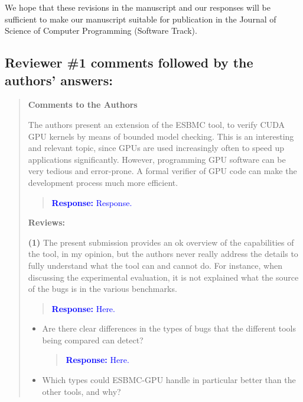 \documentclass[11pt]{article}
\newcommand\vi{\vspace{\baselineskip}}
\begin{document}
\vi

We hope that these revisions in the manuscript and our responses will be sufficient to make our manuscript suitable for publication in the Journal of Science of Computer Programming (Software Track).

\newpage

\vi
\subsection*{Reviewer \#1 comments followed by the authors' answers:}

\begin{quote}

{\bf Comments to the Authors}

The authors present an extension of the ESBMC tool, to verify CUDA GPU kernels by means of bounded model checking. This is an interesting and relevant topic, since GPUs are used increasingly often to speed up applications significantly. However, programming GPU software can be very tedious and error-prone. A formal verifier of GPU code can make the development process much more efficient.

\begin{quote}
\textcolor{blue}{\textbf{Response:} Response.}
\end{quote}

{\bf Reviews:}

{\bf (1)} The present submission provides an ok overview of the capabilities of the tool, in my opinion, but the authors never really address the details to fully understand what the tool can and cannot do. For instance, when discussing the experimental evaluation, it is not explained what the source of the bugs is in the various benchmarks.

\begin{quote}
\textcolor{blue}{\textbf{Response:} Here.}
\end{quote}

  \begin{itemize}
  \item Are there clear differences in the types of bugs that the different tools being compared can detect?
  
  \begin{quote}
  \textcolor{blue}{\textbf{Response:} Here.}
  \end{quote}
  
  \item Which types could ESBMC-GPU handle in particular better than the other tools, and why?
  

\end{itemize}
\end{quote}
\end{document}

